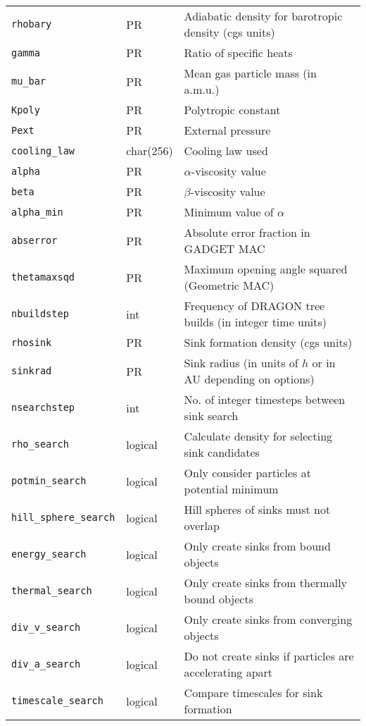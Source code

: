 \documentclass[a4paper]{article}
\newcommand{\var}[1]{\texttt{#1}}
\begin{document}
\begin{center}
\begin{supertabular}{|p{3cm}|p{2cm}|p{8cm}|}
\var{rhobary}    & PR       & Adiabatic density for barotropic density (cgs units) \\
\var{gamma}      & PR       & Ratio of specific heats \\
\var{mu\_bar}    & PR       & Mean gas particle mass (in a.m.u.) \\
\var{Kpoly}      & PR       & Polytropic constant \\ 
\var{Pext}       & PR       & External pressure \\ \hline
\var{cooling\_law} & char(256) & Cooling law used \\ \hline
\var{alpha}      & PR       & $\alpha$-viscosity value \\
\var{beta}       & PR       & $\beta$-viscosity value \\
\var{alpha\_min} & PR       & Minimum value of $\alpha$ \\ \hline
\var{abserror}   & PR       & Absolute error fraction in GADGET MAC \\ 
\var{thetamaxsqd}& PR       & Maximum opening angle squared (Geometric MAC) \\
\var{nbuildstep} & int      & Frequency of DRAGON tree builds (in integer time units) \\ \hline
\var{rhosink}    & PR       & Sink formation density (cgs units) \\
\var{sinkrad}    & PR       & Sink radius (in units of $h$ or in AU depending on options) \\
\var{nsearchstep} & int     & No. of integer timesteps between sink search \\
\var{rho\_search} & logical & Calculate density for selecting sink candidates \\
\var{potmin\_search} & logical & Only consider particles at potential minimum \\
\var{hill\_sphere\_search} & logical & Hill spheres of sinks must not overlap \\
\var{energy\_search}  & logical & Only create sinks from bound objects \\
\var{thermal\_search}  & logical & Only create sinks from thermally bound objects \\
\var{div\_v\_search}  & logical & Only create sinks from converging objects \\
\var{div\_a\_search}  & logical & Do not create sinks if particles are accelerating apart \\
\var{timescale\_search} & logical & Compare timescales for sink formation \\ \hline

\end{supertabular}
\end{center}
\end{document}
